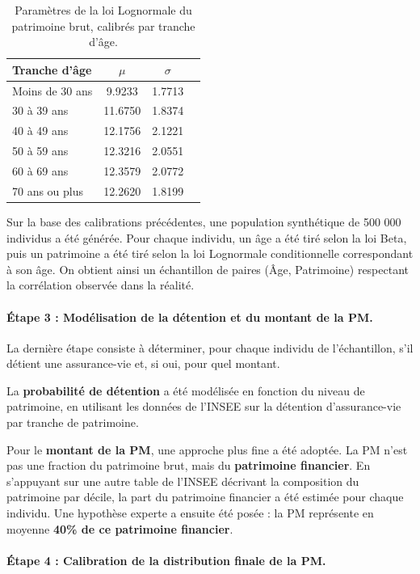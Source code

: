 \begin{table}[H]
\centering
\begin{tabular}{@{}lccc@{}}
\toprule
\textbf{Tranche d'âge} & $\mu$ & $\sigma$ \\
\midrule
Moins de 30 ans & 9.9233 & 1.7713 \\
30 à 39 ans & 11.6750 & 1.8374 \\
40 à 49 ans & 12.1756 & 2.1221 \\
50 à 59 ans & 12.3216 & 2.0551 \\
60 à 69 ans & 12.3579 & 2.0772 \\
70 ans ou plus & 12.2620 & 1.8199 \\
\bottomrule
\end{tabular}
\caption{Paramètres de la loi Lognormale du patrimoine brut, calibrés par tranche d'âge.}
\label{tab:params_patrimoine_age}
\end{table}




Sur la base des calibrations précédentes, une population synthétique de 500 000 individus a été générée. Pour chaque individu, un âge a été tiré selon la loi Beta, puis un patrimoine a été tiré selon la loi Lognormale conditionnelle correspondant à son âge. On obtient ainsi un échantillon de paires (Âge, Patrimoine) respectant la corrélation observée dans la réalité.

\paragraph{Étape 3 : Modélisation de la détention et du montant de la PM.} 

La dernière étape consiste à déterminer, pour chaque individu de l'échantillon, s'il détient une assurance-vie et, si oui, pour quel montant. 

La \textbf{probabilité de détention} a été modélisée en fonction du niveau de patrimoine, en utilisant les données de l'INSEE sur la détention d'assurance-vie par tranche de patrimoine. 

Pour le \textbf{montant de la PM}, une approche plus fine a été adoptée. La PM n'est pas une fraction du patrimoine brut, mais du \textbf{patrimoine financier}. En s'appuyant sur une autre table de l'INSEE décrivant la composition du patrimoine par décile, la part du patrimoine financier a été estimée pour chaque individu. Une hypothèse experte a ensuite été posée : la PM représente en moyenne \textbf{40\% de ce patrimoine financier}. 

\paragraph{Étape 4 : Calibration de la distribution finale de la PM.} 


